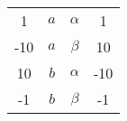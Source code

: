 \begin{example}
    \,
                \begin{figure}[htbp]
  \begin{minipage}[c]{0.25\linewidth}
      \!\!\!
    \begin{tabular}{cccc}
        1 &   $a$ &  $\alpha $ & 1 \\
        -10 & $a$ & $\beta $ & 10\\
       10 & $b$ & $\alpha $ &-10\\
        -1 & $b$ & $\beta $ &-1
    \end{tabular}
  \end{minipage}
  \begin{minipage}[c]{0.65\linewidth}
     \centering {}\vspace{0.2cm}\newline{}
  \end{minipage}
\end{figure}
\end{example}
